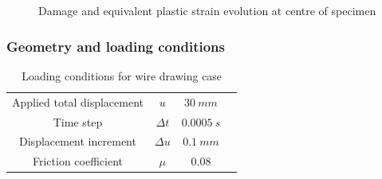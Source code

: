 \documentclass[sn-mathphys,Numbered,draft]{sn-jnl}%
\begin{document}
\begin{figure}[t!]
	\centering
	
	\caption{Damage and equivalent plastic strain evolution at centre of specimen}
	\label{label_for_entire_figure}
\end{figure}
\FloatBarrier


\subsubsection{Geometry and loading conditions}

\begin{table}[htb]
	\centering
		\begin{tabular}{cccc} \hline
		    Applied total displacement & $u$ & $30\ mm$ \\
		    Time step & $\Delta t$ & $0.0005\ s$ \\
			Displacement increment  & $\Delta u$ & $0.1\ mm$   \\
			Friction coefficient & $\mu$ & $0.08$ \\
			\hline
		\end{tabular}
	\caption{Loading conditions for wire drawing case}
	\label{tab:material_properties}
\end{table}
\end{document}
